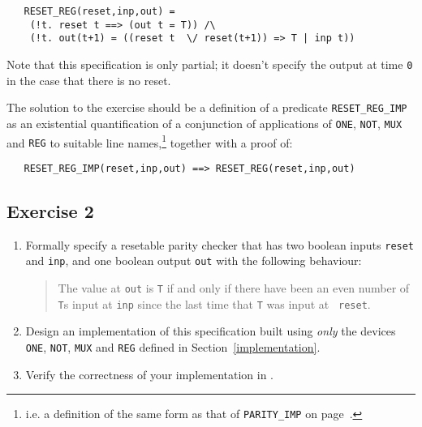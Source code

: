 {\small\baselineskip\HOLSpacing\begin{verbatim}
   RESET_REG(reset,inp,out) =
    (!t. reset t ==> (out t = T)) /\
    (!t. out(t+1) = ((reset t  \/ reset(t+1)) => T | inp t))
\end{verbatim}}

\noindent Note that this specification is only partial; it doesn't specify the
output at time {\small\verb|0|} in the case that there is no reset.

The solution to the exercise should be a definition of a predicate
{\small\verb|RESET_REG_IMP|} as an existential quantification  of a conjunction
of applications  of  {\small\verb|ONE|}, {\small\verb|NOT|}, {\small\verb|MUX|}
and {\small\verb|REG|} to suitable line  names,\footnote{i.e.   a definition of
the same form as that of {\small\tt PARITY\_IMP} on page~\pageref{parity-imp}.}
together with a proof of:

{\small\baselineskip\HOLSpacing\begin{verbatim}
   RESET_REG_IMP(reset,inp,out) ==> RESET_REG(reset,inp,out)
\end{verbatim}}


\subsection{Exercise 2}

\begin{enumerate}
\item Formally specify a resetable parity checker that has two boolean
  inputs {\small\tt reset} and {\small\tt inp}, and one boolean output
  {\small\tt out} with the following behaviour:
  \begin{quote}
    The value at {\small\tt out} is {\small\tt T} if and only if there
    have been an even number of {\small\tt T}s input at {\small\tt inp}
    since the last time that {\small\tt T} was input at {\small\tt
      reset}.
  \end{quote}
\item Design an implementation of this specification built using {\it
    only\/} the devices {\small\verb|ONE|}, {\small\verb|NOT|},
  {\small\verb|MUX|} and {\small\verb|REG|} defined in
  Section~\ref{implementation}.
\item Verify the correctness of your implementation in \HOL.
\end{enumerate}

